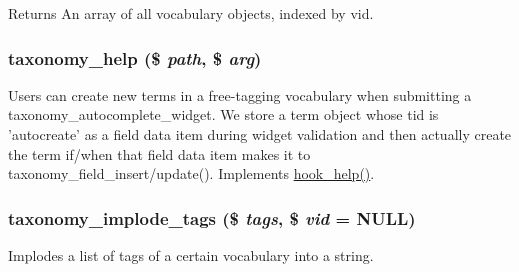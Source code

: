 \begin{DoxyReturn}{Returns}
An array of all vocabulary objects, indexed by vid. 
\end{DoxyReturn}
\hypertarget{taxonomy_8module_a1c40d35aac1b45d9be1f2155aba15557}{
\subsubsection[{taxonomy\_\-help}]{\setlength{\rightskip}{0pt plus 5cm}taxonomy\_\-help (\$ {\em path}, \/  \$ {\em arg})}}
\label{taxonomy_8module_a1c40d35aac1b45d9be1f2155aba15557}
Users can create new terms in a free-\/tagging vocabulary when submitting a taxonomy\_\-autocomplete\_\-widget. We store a term object whose tid is 'autocreate' as a field data item during widget validation and then actually create the term if/when that field data item makes it to taxonomy\_\-field\_\-insert/update(). Implements \hyperlink{group__hooks_ga5589c2714a782738e8851c4c90231f0e}{hook\_\-help()}. \hypertarget{taxonomy_8module_a848fd0e1b596605bee1563d953cac945}{
\subsubsection[{taxonomy\_\-implode\_\-tags}]{\setlength{\rightskip}{0pt plus 5cm}taxonomy\_\-implode\_\-tags (\$ {\em tags}, \/  \$ {\em vid} = {\ttfamily NULL})}}
\label{taxonomy_8module_a848fd0e1b596605bee1563d953cac945}
Implodes a list of tags of a certain vocabulary into a string.

